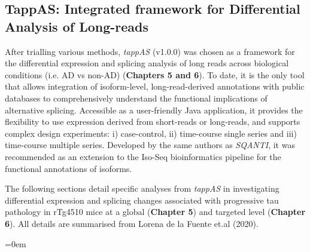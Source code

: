 \subsection{TappAS: Integrated framework for Differential Analysis of Long-reads}\label{ch3_tappas_explained}
After trialling various methods, \textit{tappAS}\cite{DeLaFuente2020} (v1.0.0) was chosen as a framework for the differential expression and splicing analysis of long reads across biological conditions (i.e. AD vs non-AD) (\textbf{Chapters 5 and 6}). To date, it is the only tool that allows integration of isoform-level, long-read-derived annotations with public databases to comprehensively understand the functional implications of alternative splicing. Accessible as a user-friendly Java application, it provides the flexibility to use expression derived from short-reads or long-reads, and supports complex design experiments: i) case-control, ii) time-course single series and iii) time-course multiple series. Developed by the same authors as \textit{SQANTI}\cite{Tardaguila2018}, it was recommended as an extension to the Iso-Seq bioinformatics pipeline for the functional annotations of isoforms.    

The following sections detail specific analyses from \textit{tappAS} in investigating differential expression and splicing changes associated with progressive tau pathology in rTg4510 mice at a global (\textbf{Chapter 5}) and targeted level (\textbf{Chapter 6}). All details are summarised from Lorena de la Fuente et.al (2020)\cite{DeLaFuente2020}.

\vspace{2cm}
\begingroup
\parindent=0em
\localtableofcontents 
\endgroup


